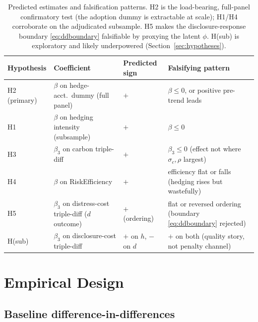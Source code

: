 \documentclass[11pt,a4paper]{article}
\begin{document}
\begin{table}[h]
\centering
\begin{tabular}{@{}l >{\raggedright\arraybackslash}p{3.9cm} >{\raggedright\arraybackslash}p{1.9cm} >{\raggedright\arraybackslash}p{4.9cm}@{}}
\toprule
Hypothesis & Coefficient & Predicted sign & Falsifying pattern \\
\midrule
H2 (primary) & $\beta$ on hedge-acct.\ dummy (full panel) & $+$ & $\beta\le0$, or positive pre-trend leads \\
H1 & $\beta$ on hedging intensity (subsample) & $+$ & $\beta\le0$ \\
H3 & $\beta_3$ on carbon triple-diff & $+$ & $\beta_3\le0$ (effect not where $\sigma_c,\rho$ largest) \\
H4 & $\beta$ on RiskEfficiency & $+$ & efficiency flat or falls (hedging rises but wastefully) \\
H5 & $\beta_3$ on distress-cost triple-diff ($d$ outcome) & $+$ (ordering) & flat or reversed ordering (boundary \eqref{eq:ddboundary} rejected) \\
H(sub) & $\beta_3$ on disclosure-cost triple-diff & $+$ on $h$, $-$ on $d$ & $+$ on both (quality story, not penalty channel) \\
\bottomrule
\end{tabular}
\caption{Predicted estimates and falsification patterns. H2 is the load-bearing, full-panel confirmatory test (the adoption dummy is extractable at scale); H1/H4 corroborate on the adjudicated subsample. H5 makes the disclosure-response boundary \eqref{eq:ddboundary} falsifiable by proxying the latent $\phi$. H(sub) is exploratory and likely underpowered (Section~\ref{sec:hypotheses}).}
\label{tab:predictions}
\end{table}

\section{Empirical Design}
\label{sec:design}

\subsection{Baseline difference-in-differences}
\label{sec:baseline}
\end{document}
